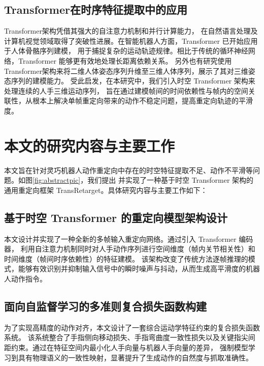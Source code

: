 \subsection{Transformer在时序特征提取中的应用}
Transformer架构凭借其强大的自注意力机制和并行计算能力，
在自然语言处理及计算机视觉领域取得了突破性进展\cite{vaswaniAttentionAllYou2017a}。在智能机器人方面，Transformer 已开始应用于人体骨骼序列建模，
用于捕捉复杂的运动轨迹规律。相比于传统的循环神经网络，Transformer 能够更有效地处理长距离依赖关系。
另外也有研究使用Transformer架构来将二维人体姿态序列升维至三维人体序列，展示了其对三维姿态序列的建模能力。
受此启发，在本研究中，我们引入时空 Transformer 架构来处理连续的人手三维运动序列，
旨在通过建模帧间的时间依赖性与帧内的空间关联性，从根本上解决单帧重定向带来的动作不稳定问题，提高重定向轨迹的平滑度。

\section{本文的研究内容与主要工作}
本文旨在针对灵巧机器人动作重定向中存在的时空特征提取不足、动作不平滑等问题。如图\ref{fig:abstractpic}，我们提出
并实现了一种基于时空 Transformer 架构的通用重定向框架 TransRetarget。具体研究内容与主要工作如下：

\subsection{基于时空 Transformer 的重定向模型架构设计}
本文设计并实现了一种全新的多帧输入重定向网络。通过引入 Transformer 编码器，
利用自注意力机制同时对人手动作序列进行空间维度（帧内关节相关性）和时间维度（帧间时序依赖性）的特征建模。
该架构改变了传统方法逐帧推理的模式，能够有效识别并抑制输入信号中的瞬时噪声与抖动，从而生成高平滑度的机器人动作指令。

\subsection{面向自监督学习的多准则复合损失函数构建}
为了实现高精度的动作对齐，本文设计了一套综合运动学特征约束的复合损失函数系统。
该系统整合了手指侧向移动损失、手指弯曲度一致性损失以及关键指尖间距约束。通过在特征空间内最小化人手向量与机器人手向量的差异，
强制模型学习到具有物理语义的一致性映射，显著提升了生成动作的自然度与抓取准确性。

